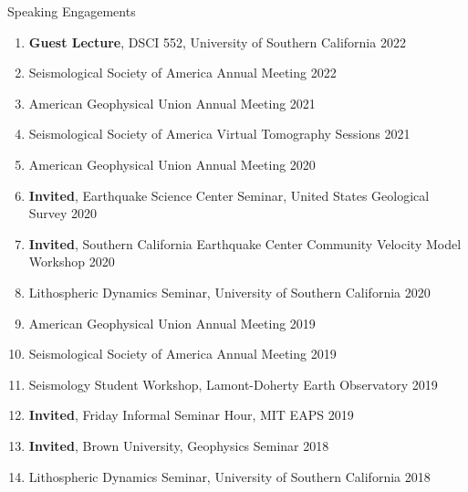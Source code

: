 \begin{rSection}{Speaking Engagements}
	\begin{enumerate}
		\item \textbf{Guest Lecture}, DSCI 552, University of Southern California \hfill 2022
		\item Seismological Society of America Annual Meeting \hfill 2022
		\item American Geophysical Union Annual Meeting \hfill 2021
		\item Seismological Society of America Virtual Tomography Sessions \hfill 2021
		\item American Geophysical Union Annual Meeting \hfill 2020
		\item \textbf{Invited}, Earthquake Science Center Seminar, United States Geological Survey \hfill 2020
		\item \textbf{Invited}, Southern California Earthquake Center Community Velocity Model Workshop \hfill 2020
		\item Lithospheric Dynamics Seminar, University of Southern California \hfill 2020
		\item American Geophysical Union Annual Meeting \hfill 2019
		\item Seismological Society of America Annual Meeting \hfill 2019
		\item Seismology Student Workshop, Lamont-Doherty Earth Observatory \hfill 2019
		\item \textbf{Invited}, Friday Informal Seminar Hour, MIT EAPS \hfill 2019
		\item \textbf{Invited}, Brown University, Geophysics Seminar \hfill 2018
		\item Lithospheric Dynamics Seminar, University of Southern California \hfill 2018
	\end{enumerate}
\end{rSection}
